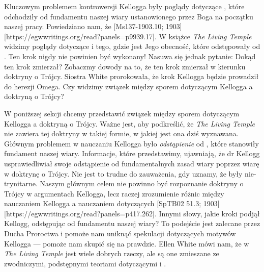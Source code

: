 
Kluczowym problemem kontrowersji  Kellogga były poglądy dotyczące , które odchodziły od fundamentu naszej wiary ustanowionego przez Boga na początku naszej pracy. Powiedziano nam, że [Ms137-1903.10; 1903][https://egwwritings.org/read?panels=p9939.17]. W książce \textit{The Living Temple} widzimy poglądy dotyczące  i tego, gdzie jest Jego obecność, które odstępowały od . Ten krok nigdy nie powinien być wykonany! Nasuwa się jednak pytanie: Dokąd ten krok zmierzał? Zobaczmy dowody na to, że ten krok zmierzał w kierunku doktryny o Trójcy. Siostra White prorokowała, że krok Kellogga będzie prowadził do herezji Omega. Czy widzimy związek między sporem dotyczącym Kellogga a doktryną o Trójcy?

W poniższej sekcji chcemy przedstawić związek między sporem dotyczącym Kellogga a doktryną o Trójcy. Ważne jest, aby podkreślić, że \textit{The Living Temple} nie zawiera tej doktryny w takiej formie, w jakiej jest ona dziś wyznawana. Głównym problemem w nauczaniu Kellogga było \textit{odstąpienie} od , które stanowiły fundament naszej wiary. Informacje, które przedstawimy, ujawniają, że dr Kellogg usprawiedliwiał swoje odstąpienie od fundamentalnych zasad wiary poprzez wiarę w doktrynę o Trójcy. Nie jest to trudne do zauważenia, gdy uznamy, że  były nie-trynitarne. Naszym głównym celem nie powinno być rozpoznanie doktryny o Trójcy w argumentach Kellogga, lecz raczej zrozumienie różnic między nauczaniem Kellogga a nauczaniem  dotyczących [SpTB02 51.3; 1903][https://egwwritings.org/read?panels=p417.262]. Innymi słowy, jakie kroki podjął Kellogg, odstępując od fundamentu naszej wiary? To podejście jest zalecane przez Ducha Proroctwa i pomoże nam uniknąć spekulacji dotyczących motywów Kellogga — pomoże nam skupić się na prawdzie. Ellen White mówi nam, że w \textit{The Living Temple} jest wiele dobrych rzeczy, ale są one zmieszane ze zwodniczymi, podstępnymi teoriami dotyczącymi  i .

